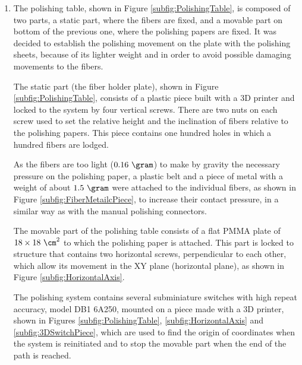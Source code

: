 \begin{enumerate}
\item{} The polishing table, shown in Figure \ref{subfig:PolishingTable}, is composed of two parts, a static part, where the fibers are fixed, and a movable part on bottom of the previous one, where the polishing papers are fixed. It was decided to establish the polishing movement on the plate with the polishing sheets, because of its lighter weight and in order to avoid possible damaging movements to the fibers.

The static part (the fiber holder plate), shown in Figure \ref{subfig:PolishingTable}, consists of a plastic piece built with a 3D printer and locked to the system by four vertical screws. There are two nuts on each screw used to set the relative height and the inclination of fibers relative to the polishing papers. This piece contains one hundred holes in which a hundred fibers are lodged. 

As the fibers are too light ($0.16~\gram$) to make by gravity the necessary pressure on the polishing paper, a plastic belt and a piece of metal with a weight of about $1.5~\gram$ were attached to the individual fibers, as shown in Figure \ref{subfig:FiberMetailcPiece}, to increase their contact pressure, in a similar way as with the manual polishing connectors. 

The movable part of the polishing table consists of a flat PMMA plate of $18 \times 18~\cm^2$ to which the polishing paper is attached. This part is locked to structure \cite{StructureAxis} that contains two horizontal screws, perpendicular to each other, which allow its movement in the XY plane (horizontal plane), as shown in Figure \ref{subfig:HorizontalAxis}.

The polishing system contains several subminiature switches with high repeat accuracy, model DB1 6A250, mounted on a piece made with a 3D printer, shown in Figures \ref{subfig:PolishingTable}, \ref{subfig:HorizontalAxis} and \ref{subfig:3DSwitchPiece}, which are used to find the origin of coordinates when the system is reinitiated and to stop the movable part when the end of the path is reached. 


\end{enumerate}
